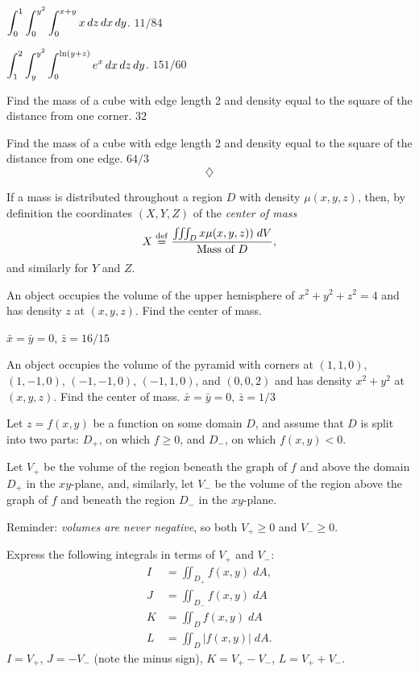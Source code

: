 \begin{multicols}{2}
\subprob$\displaystyle\int_{0}^{1}\int_{0}^{y^2}\int_{0}^{x+y} 
x\,dz\,dx\,dy$.
\answer
$11/84$
\endanswer

\subprob$\displaystyle\int_{1}^{2}\int_{y}^{y^2}\int_{0}^{\ln(y+z)} 
e^x\,dx\,dz\,dy$.
\answer
$151/60$
\endanswer


\problem Find the mass of a cube with edge length 2 and density equal 
to the square of the distance from one corner.
\answer
$32$
\endanswer

\problem Find the mass of a cube with edge length 2 and density equal 
to the square of the distance from one edge.
\answer
$64/3$
\endanswer
\[
\diamondsuit
\]

If a mass is distributed throughout a region $D$ with density
$\mu(x, y, z)$, then, by definition the coordinates $(X,Y,Z)$
of the \emph{center of mass} 
\[
X \stackrel{\rm def}{=} \frac{\iiint_D x\mu(x, y, z))\; dV}{\text{Mass of }D},
\]
and similarly for $Y$ and $Z$.

\problem An object occupies the volume of the upper hemisphere of  
$x^2+y^2+z^2=4$ and has density $z$ at $(x,y,z)$. Find the center of mass.

\answer
$\bar x=\bar y=0$, $\bar z=16/15$
\endanswer

\problem An object occupies the volume of the pyramid with corners at  
$(1,1,0)$, $(1,-1,0)$, $(-1,-1,0)$, $(-1,1,0)$, and $(0,0,2)$ and has
density $x^2+y^2$ at $(x,y,z)$. Find the center of mass.
\answer
$\bar x=\bar y=0$, $\bar z=1/3$
\endanswer

\problem Let $z=f(x, y)$ be a function on some domain $D$, 
and assume that $D$ is split into two parts:  $D_+$, on which
$f\geq 0$, and $D_-$, on which $f(x, y)<0$.

Let $V_+$ be the volume of the region beneath the graph of $f$ and above the
domain $D_+$ in the $xy$-plane, and, similarly, let $V_-$ be the
volume of the region above the graph of $f$ and beneath the region
$D_-$ in the $xy$-plane.

Reminder:  \emph{volumes are never negative}, so both $V_+\ge0$ and
$V_-\ge0$.

\subprob Express the following integrals in terms of $V_+$ and 
$V_-$:
\begin{align*}
  I &= \iint_{D_+}f(x, y)\; dA, \\
  J &= \iint_{D_-}f(x, y)\; dA \\
  K &= \iint_{D}f(x, y)\; dA \\
  L &= \iint_{D}|f(x, y)|\; dA.
\end{align*}
\answer
$I=V_+$, $J= -V_-$ (note the minus sign),
$K= V_+-V_-$, $L = V_+ + V_-$.
\endanswer


\end{multicols}
